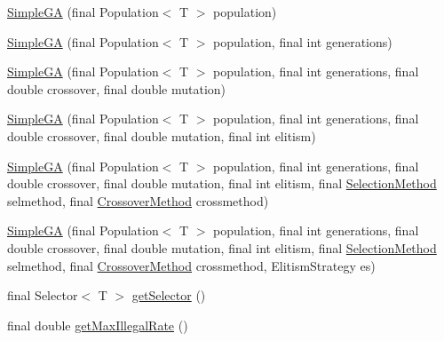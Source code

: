 \begin{CompactItemize}
\item 
\hyperlink{classjenes_1_1algorithms_1_1_simple_g_a_3_01_t_01extends_01_chromosome_01_4_3f8162d093934286fd3963580f380d9a}{SimpleGA} (final Population$<$ T $>$ population)
\item 
\hyperlink{classjenes_1_1algorithms_1_1_simple_g_a_3_01_t_01extends_01_chromosome_01_4_c26dcb81ef937ded77152a908ac55699}{SimpleGA} (final Population$<$ T $>$ population, final int generations)
\item 
\hyperlink{classjenes_1_1algorithms_1_1_simple_g_a_3_01_t_01extends_01_chromosome_01_4_d6c74ec603e7fbc1610f41ad9ee63981}{SimpleGA} (final Population$<$ T $>$ population, final int generations, final double crossover, final double mutation)
\item 
\hyperlink{classjenes_1_1algorithms_1_1_simple_g_a_3_01_t_01extends_01_chromosome_01_4_659f0192b24b5d8af22f73f190b67867}{SimpleGA} (final Population$<$ T $>$ population, final int generations, final double crossover, final double mutation, final int elitism)
\item 
\hyperlink{classjenes_1_1algorithms_1_1_simple_g_a_3_01_t_01extends_01_chromosome_01_4_c23644006d7eb399fd4d26e77da8826d}{SimpleGA} (final Population$<$ T $>$ population, final int generations, final double crossover, final double mutation, final int elitism, final \hyperlink{classjenes_1_1algorithms_1_1_simple_g_a_3_01_t_01extends_01_chromosome_01_4_6310e8ba52593a9b9ab7809caa9ba296}{SelectionMethod} selmethod, final \hyperlink{classjenes_1_1algorithms_1_1_simple_g_a_3_01_t_01extends_01_chromosome_01_4_d015c6a036c7234fe34a1a78fc3c55bf}{CrossoverMethod} crossmethod)
\item 
\hyperlink{classjenes_1_1algorithms_1_1_simple_g_a_3_01_t_01extends_01_chromosome_01_4_068fcb44d18c3204fbb9b13daebd4f6d}{SimpleGA} (final Population$<$ T $>$ population, final int generations, final double crossover, final double mutation, final int elitism, final \hyperlink{classjenes_1_1algorithms_1_1_simple_g_a_3_01_t_01extends_01_chromosome_01_4_6310e8ba52593a9b9ab7809caa9ba296}{SelectionMethod} selmethod, final \hyperlink{classjenes_1_1algorithms_1_1_simple_g_a_3_01_t_01extends_01_chromosome_01_4_d015c6a036c7234fe34a1a78fc3c55bf}{CrossoverMethod} crossmethod, ElitismStrategy es)
\item 
final Selector$<$ T $>$ \hyperlink{classjenes_1_1algorithms_1_1_simple_g_a_3_01_t_01extends_01_chromosome_01_4_c1b67ab65d05c07bd67aa8b072c965d7}{getSelector} ()
\item 
final double \hyperlink{classjenes_1_1algorithms_1_1_simple_g_a_3_01_t_01extends_01_chromosome_01_4_6c450c770d9060faf01820a48491561a}{getMaxIllegalRate} ()

\end{CompactItemize}
